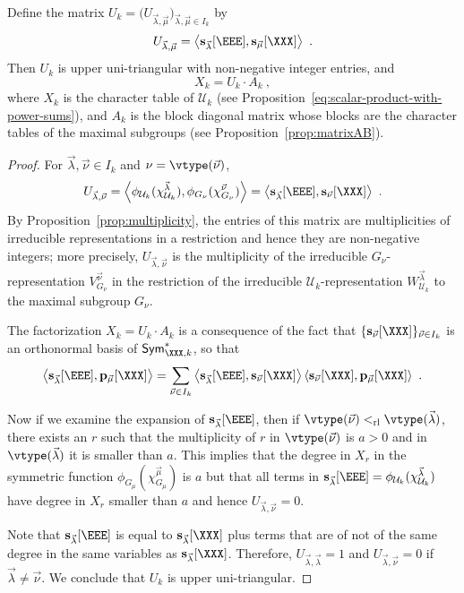 \begin{prop}\label{prop:UAfactorization}
Define the matrix
$U_k = \big( U_{ \vec{\lambda}, \vec{\mu}} \big)_{\vec{\lambda}, \vec{\mu}\in I_k}$
by
\[
U_{ \vec{\lambda}, \vec{\mu}} = \left<
\mathbf{s}_{\vec{\lambda}}[\EEE], \mathbf{s}_{\vec{\mu}}[\XXX] \right>~.
\]
Then $U_k$ is upper uni-triangular with non-negative integer entries, and
\[
X_k = U_k \cdot A_k~,
\]
where $X_k$ is the character table of $\mathcal{U}_k$ \textup{(}see Proposition~\ref{eq:scalar-product-with-power-sums}\textup{)},
and $A_k$ is the block diagonal matrix whose blocks
are the character tables of the maximal subgroups \textup{(}see Proposition~\ref{prop:matrixAB}\textup{)}.
\end{prop}

\begin{proof}
For $\vec{\lambda}, \vec{\nu} \in I_k$ and $\nu = \vtype(\vec{\nu})$,
\[
U_{\vec{\lambda}, \vec{\nu}} =
\left< \phi_{\mathcal{U}_k}(\chi^{\vec{\lambda}}_{\mathcal{U}_k}),
\phi_{G_\nu}(\chi^{\vec{\nu}}_{G_\nu}) \right>
=
\left< \mathbf{s}_{\vec{\lambda}}[\EEE], \mathbf{s}_{\vec{\nu}}[\XXX] \right>~.
\]
By Proposition~\ref{prop:multiplicity},
the entries of this matrix are multiplicities of irreducible representations in a
restriction and hence they are non-negative integers; more precisely,
$U_{\vec{\lambda},\vec{\nu}}$ is the multiplicity of the irreducible
$G_\nu$-representation $V^{\vec{\nu}}_{G_\nu}$ in the restriction of
the irreducible $\mathcal{U}_k$-representation
$W^{\vec{\lambda}}_{\mathcal{U}_k}$ to the maximal subgroup $G_{\nu}$.

The factorization $X_k = U_k \cdot A_k$ is a consequence of the fact
that $\{ \mathbf{s}_{\vec{\nu}}[\XXX] \}_{\vec{\nu} \in I_k}$ is an orthonormal
basis of $\mathsf{Sym}^{\ast}_{\XXX,k}$, so that
\[
\left< \mathbf{s}_{\vec{\lambda}}[\EEE], \mathbf{p}_{\vec{\mu}}[\XXX] \right> =
\sum_{\vec{\nu} \in I_k}
\left< \mathbf{s}_{\vec{\lambda}}[\EEE], \mathbf{s}_{\vec{\nu}}[\XXX] \right>
\left< \mathbf{s}_{\vec{\nu}}[\XXX], \mathbf{p}_{\vec{\mu}}[\XXX] \right>~.
\]

Now if we examine the expansion of
$\mathbf{s}_{\vec{\lambda}}[\EEE]$,
then if $\vtype(\vec{\nu}) <_{\mathrm{rl}} \vtype(\vec{\lambda})$, there
exists an $r$ such that the multiplicity of $r$ in $\vtype(\vec{\nu})$
is $a>0$ and in $\vtype(\vec{\lambda})$ it is smaller than $a$.
This implies that the degree in $X_r$ in
the symmetric function $\phi_{G_\mu}(\chi^{\vec{\mu}}_{G_\mu})$ is
$a$ but that all terms in
$\mathbf{s}_{\vec{\lambda}}[\EEE] = \phi_{\mathcal{U}_k}(\chi^{\vec{\lambda}}_{\mathcal{U}_k})$
have degree in $X_r$ smaller than $a$ and hence $U_{\vec{\lambda},\vec{\nu}} = 0$.

Note that $\mathbf{s}_{\vec{\lambda}}[\EEE]$ is equal to $\mathbf{s}_{\vec{\lambda}}[\XXX]$ plus
terms that are of not of the same degree in the same variables
as $\mathbf{s}_{\vec{\lambda}}[\XXX]$.  Therefore,
$U_{\vec{\lambda},\vec{\lambda}} = 1$ and
$U_{\vec{\lambda},\vec{\nu}} = 0$ if $\vec{\lambda} \neq \vec{\nu}$.
We conclude that $U_k$ is upper uni-triangular.
\end{proof}

